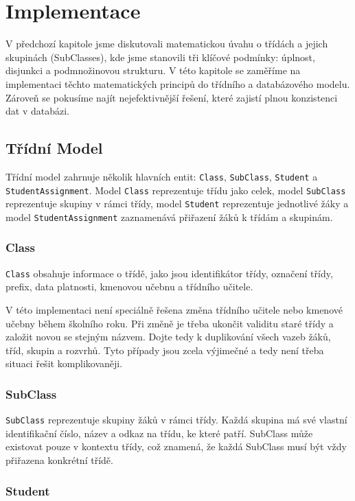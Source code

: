 \section{Implementace}
V předchozí kapitole jsme diskutovali matematickou úvahu o třídách a jejich skupinách (SubClasses), kde jsme stanovili tři klíčové podmínky: úplnost, disjunkci a podmnožinovou strukturu. V této kapitole se zaměříme na implementaci těchto matematických principů do třídního a databázového modelu. Zároveň se pokusíme najít nejefektivnější řešení, které zajistí plnou konzistenci dat v databázi.

\subsection{Třídní Model}

Třídní model zahrnuje několik hlavních entit: \texttt{Class}, \texttt{SubClass}, \texttt{Student} a \texttt{StudentAssignment}. Model \texttt{Class} reprezentuje třídu jako celek, model \texttt{SubClass} reprezentuje skupiny v rámci třídy, model \texttt{Student} reprezentuje jednotlivé žáky a model \texttt{StudentAssignment} zaznamenává přiřazení žáků k třídám a skupinám.

\subsubsection*{Class}

\texttt{Class} obsahuje informace o třídě, jako jsou identifikátor třídy, označení třídy, prefix, data platnosti, kmenovou učebnu a třídního učitele. 

V této implementaci není speciálně řešena změna třídního učitele nebo kmenové učebny během školního roku. Při změně je třeba ukončit validitu staré třídy a založit novou se stejným názvem. Dojte tedy k duplikování všech vazeb žáků, tříd, skupin a rozvrhů. Tyto případy jsou zcela výjimečné a tedy není třeba situaci řešit komplikovaněji.

\subsubsection*{SubClass}

\texttt{SubClass} reprezentuje skupiny žáků v rámci třídy. Každá skupina má své vlastní identifikační číslo, název a odkaz na třídu, ke které patří. SubClass může existovat pouze v kontextu třídy, což znamená, že každá SubClass musí být vždy přiřazena konkrétní třídě.

\subsubsection*{Student}

